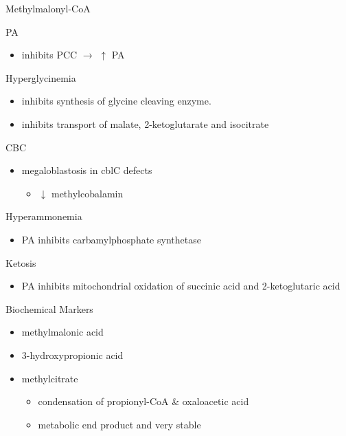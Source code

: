 \documentclass[presentation, smaller]{beamer}
\begin{document}
\begin{frame}[label={sec:orgheadline10}]{Methylmalonyl-CoA}
\begin{block}{PA}
\begin{itemize}
\item inhibits PCC \(\to\) \(\uparrow\) PA
\end{itemize}
\end{block}
\begin{block}{Hyperglycinemia}
\begin{itemize}
\item inhibits synthesis of glycine cleaving enzyme.
\item inhibits transport of malate, 2-ketoglutarate and isocitrate
\end{itemize}
\end{block}
\begin{block}{CBC}
\begin{itemize}
\item megaloblastosis in cblC defects
\begin{itemize}
\item \(\downarrow\) methylcobalamin
\end{itemize}
\end{itemize}
\end{block}

\begin{block}{Hyperammonemia}
\begin{itemize}
\item PA inhibits carbamylphosphate synthetase
\end{itemize}
\end{block}
\begin{block}{Ketosis}
\begin{itemize}
\item PA inhibits mitochondrial oxidation of succinic acid and 2-ketoglutaric acid
\end{itemize}
\end{block}
\end{frame}

\begin{frame}[label={sec:orgheadline11}]{Biochemical Markers}
\begin{itemize}
\item methylmalonic acid
\item 3-hydroxypropionic acid
\item methylcitrate
\begin{itemize}
\item condensation of propionyl-CoA \& oxaloacetic acid
\item metabolic end product and very stable
\end{itemize}
\end{itemize}
\end{frame}
\end{document}
